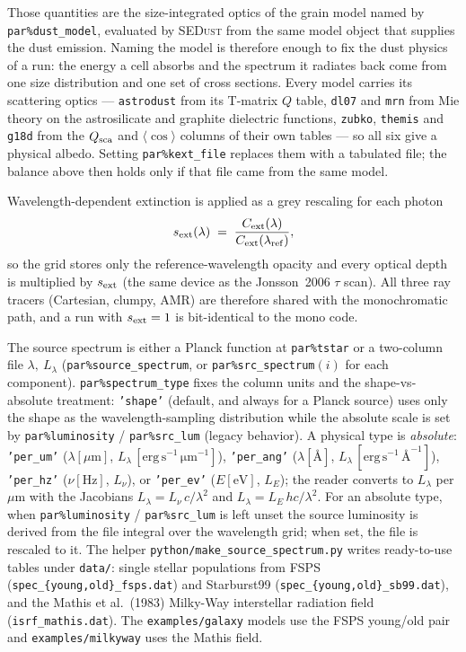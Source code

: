 \documentclass[english,a4paper]{kiseon_memo}
\newcommand{\pp}[1]{\texttt{par\%#1}}
\newcommand{\code}[1]{\texttt{#1}}
\newcommand{\file}[1]{\texttt{#1}}
\begin{document}
Those quantities are the size-integrated optics of the grain model named by
\pp{dust\_model}, evaluated by \textsc{SEDust} from the same model object that
supplies the dust emission.  Naming the model is therefore enough to fix the
dust physics of a run: the energy a cell absorbs and the spectrum it radiates
back come from one size distribution and one set of cross sections.  Every model
carries its scattering optics --- \code{astrodust} from its T-matrix $Q$ table,
\code{dl07} and \code{mrn} from Mie theory on the astrosilicate and graphite
dielectric functions, \code{zubko}, \code{themis} and \code{g18d} from the
$Q_{\rm sca}$ and $\langle\cos\rangle$ columns of their own tables --- so all
six give a physical albedo.  Setting \pp{kext\_file}
replaces them with a tabulated file; the balance above then holds only if that
file came from the same model.

Wavelength-dependent extinction is applied as a grey rescaling for each photon
\begin{equation}
  s_{\rm ext}(\lambda) \;=\; \frac{C_{\rm ext}(\lambda)}{C_{\rm ext}(\lambda_{\rm ref})},
\end{equation}
so the grid stores only the reference-wavelength opacity and every optical
depth is multiplied by $s_{\rm ext}$ (the same device as the Jonsson~2006
$\tau$ scan).  All three ray tracers (Cartesian, clumpy, AMR) are therefore
shared with the monochromatic path, and a run with $s_{\rm ext}=1$ is
bit-identical to the mono code.

The source spectrum is either a Planck function at \pp{tstar} or a two-column
file $\lambda,\ L_\lambda$ (\pp{source\_spectrum}, or \pp{src\_spectrum}$(i)$ for
each component).  \pp{spectrum\_type} fixes the column units and the shape-vs-absolute
treatment: \code{'shape'} (default, and always for a Planck source) uses only the
shape as the wavelength-sampling distribution while the absolute scale is set by
\pp{luminosity} / \pp{src\_lum} (legacy behavior).  A physical type is
\emph{absolute}: \code{'per\_um'} ($\lambda[\mu\mathrm{m}]$, $L_\lambda\,[\mathrm{erg\,s^{-1}\,\mu m^{-1}}]$),
\code{'per\_ang'} ($\lambda[\text{\AA}]$, $L_\lambda\,[\mathrm{erg\,s^{-1}\,\text{\AA}^{-1}}]$),
\code{'per\_hz'} ($\nu[\mathrm{Hz}]$, $L_\nu$), or \code{'per\_ev'} ($E[\mathrm{eV}]$, $L_E$);
the reader converts to $L_\lambda$ per $\mu$m with the Jacobians
$L_\lambda=L_\nu\,c/\lambda^2$ and $L_\lambda=L_E\,hc/\lambda^2$.  For an absolute type,
when \pp{luminosity} / \pp{src\_lum} is left unset the source luminosity is derived
from the file integral over the wavelength grid; when set, the file is rescaled to it.
The helper \file{python/make\_source\_spectrum.py}
writes ready-to-use tables under \file{data/}: single stellar populations from
FSPS (\file{spec\_\{young,old\}\_fsps.dat}) and Starburst99
(\file{spec\_\{young,old\}\_sb99.dat}), and the Mathis et al.~(1983) Milky-Way
interstellar radiation field (\file{isrf\_mathis.dat}).  The \file{examples/galaxy}
models use the FSPS young/old pair and \file{examples/milkyway} uses the Mathis
field.
\end{document}
